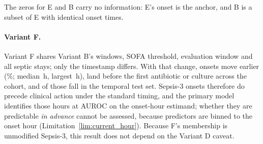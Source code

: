 \begin{table}[H]
    \centering\small
    \caption{Events in the treatment-anchored (pre-treatment) evaluation window.
    E's and B's zeros are entailed by Proposition~\ref{prop:h3}. Variant F holds
    the Sepsis-3 conjunction and the labelled stays fixed and changes only the
    onset timestamp to the standard $\min(t_{\text{susp}}, t_{\text{SOFA}})$;
    Variant D removes the infection anchor altogether.}
    \label{tab:pretreatment_label}
\end{table}

The zeros for E and B carry no information: E's onset is the anchor, and B is a
subset of E with identical onset times.

\paragraph{Variant F.}
Variant F shares Variant B's windows, SOFA threshold, evaluation window and all
\pcFNOnsets{} septic stays; only the timestamp differs. With that change, \pcFNMovedEarlier{}
onsets move earlier (\pcFPctMovedEarlier\%; median \pcFMedianShiftH\,h, largest
\pcFMaxShiftH\,h), \pcFNBeforeAnchor{} land before the first antibiotic or
culture across the cohort, and \pcPreTreatOnsetsVarF{} of those fall in the
temporal test set. Sepsis-3 onsets therefore do precede clinical action under
the standard timing, and the primary model identifies those hours at
\pcPreTreatAurocPrimaryF{} AUROC on the onset-hour estimand; whether they are
predictable \emph{in advance} cannot be assessed, because predictors are binned
to the onset hour (Limitation~\ref{lim:current_hour}). Because F's membership
is unmodified Sepsis-3, this result does not depend on the Variant D caveat.

